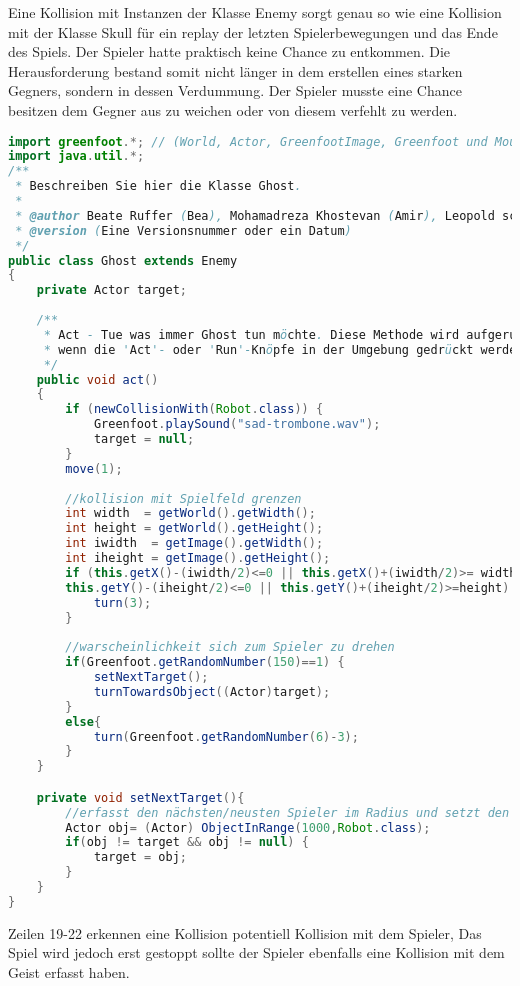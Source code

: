 \documentclass{pi1}
\begin{document}
Eine Kollision mit Instanzen der Klasse Enemy sorgt genau so wie eine Kollision mit der Klasse Skull für ein replay der letzten Spielerbewegungen und das Ende des Spiels.
Der Spieler hatte praktisch keine Chance zu entkommen. Die Herausforderung bestand somit nicht länger in dem erstellen eines starken Gegners, sondern in dessen Verdummung.
Der Spieler musste eine Chance besitzen dem Gegner aus zu weichen oder von diesem verfehlt zu werden.

\begin{lstlisting}[caption={Klasse \emph{Ghost}},firstnumber=1, language=Java]
import greenfoot.*; // (World, Actor, GreenfootImage, Greenfoot und MouseInfo)
import java.util.*;
/**
 * Beschreiben Sie hier die Klasse Ghost.
 * 
 * @author Beate Ruffer (Bea), Mohamadreza Khostevan (Amir), Leopold schulz-Hanke (Leo) 
 * @version (Eine Versionsnummer oder ein Datum)
 */
public class Ghost extends Enemy
{
    private Actor target; 
    
    /**
     * Act - Tue was immer Ghost tun möchte. Diese Methode wird aufgerufen,
     * wenn die 'Act'- oder 'Run'-Knöpfe in der Umgebung gedrückt werden.
     */
    public void act() 
    {
        if (newCollisionWith(Robot.class)) {
            Greenfoot.playSound("sad-trombone.wav");
            target = null;
        }
        move(1);
        
        //kollision mit Spielfeld grenzen
        int width  = getWorld().getWidth();
        int height = getWorld().getHeight();
        int iwidth  = getImage().getWidth();
        int iheight = getImage().getHeight();
        if (this.getX()-(iwidth/2)<=0 || this.getX()+(iwidth/2)>= width||
        this.getY()-(iheight/2)<=0 || this.getY()+(iheight/2)>=height) {
            turn(3);
        }
        
        //warscheinlichkeit sich zum Spieler zu drehen
        if(Greenfoot.getRandomNumber(150)==1) {
            setNextTarget();
            turnTowardsObject((Actor)target);
        }
        else{
            turn(Greenfoot.getRandomNumber(6)-3);
        }
    }

    private void setNextTarget(){
        //erfasst den nächsten/neusten Spieler im Radius und setzt den Geist auf diesen an
        Actor obj= (Actor) ObjectInRange(1000,Robot.class);
        if(obj != target && obj != null) {
            target = obj;
        }
    }
}

\end{lstlisting}
Zeilen 19-22 erkennen eine Kollision potentiell Kollision mit dem Spieler,
Das Spiel wird jedoch erst gestoppt sollte der Spieler ebenfalls eine Kollision mit dem Geist erfasst haben.
\end{document}
